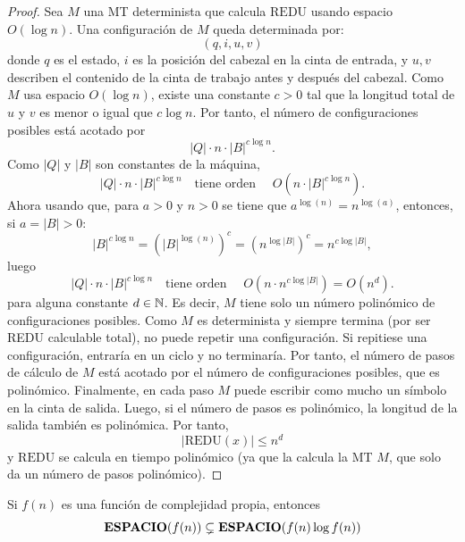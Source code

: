 \begin{ejercicio}
    \begin{proof}
        Sea $M$ una MT determinista que calcula $\mathrm{REDU}$ usando espacio
        $O(\log n)$. Una configuración de $M$ queda 
        determinada por: $$(q,i,u,v)$$
        donde $q$ es el estado, $i$ es la posición del cabezal en la cinta de
        entrada, y $u,v$ describen el contenido de la cinta de trabajo antes y
        después del cabezal. Como $M$ usa espacio $O(\log n)$, existe una constante
        $c > 0$ tal que la longitud total de $u$ y $v$ es menor o igual que
        $c\log n$. Por tanto, el número de configuraciones posibles está acotado por
        $$|Q|\cdot n\cdot |B|^{c\log n}.$$
        Como $|Q|$ y $|B|$ son constantes de la máquina,
        $$|Q|\cdot n\cdot |B|^{c\log n} \quad \text{tiene orden } \quad O\left(n\cdot |B|^{c\log n}\right).
        $$Ahora usando que, para $a > 0$ y $n>0$ se tiene que $a^{\log(n)} = n^{\log(a)}$, entonces, si $a = |B| > 0$:
        $$|B|^{c\log n} = (|B|^{\log(n)})^{c} = (n^{\log |B|})^c = n^{c\log |B|},$$
        luego
        $$|Q|\cdot n\cdot |B|^{c\log n} \quad \text{tiene orden } \quad O(n \cdot n^{c \log |B|}) = O(n^d).
        $$
        para alguna constante $d \in \mathbb{N}$. Es decir, $M$ tiene solo un número polinómico
        de configuraciones posibles. Como $M$ es determinista y siempre termina (por ser REDU calculable total), no puede repetir una
        configuración. Si repitiese una configuración, entraría en un ciclo y no
        terminaría. Por tanto, el número de pasos de cálculo de $M$ está acotado por
        el número de configuraciones posibles, que es polinómico. Finalmente, en cada 
        paso $M$ puede escribir como mucho un símbolo en la cinta
        de salida. Luego, si el número de pasos es polinómico, la longitud de la salida
        también es polinómica. Por tanto,
        $$|\mathrm{REDU}(x)|\leq n^d$$
        y $\mathrm{REDU}$ se calcula en tiempo polinómico (ya que la calcula la MT $M$, que solo da un número
        de pasos polinómico).
    \end{proof}

    \begin{teo}\label{teo:jerarqesp}
        Si $f(n)$ es una función de complejidad propia, entonces 
        $$\textbf{ESPACIO}(f(n)) \subsetneq \textbf{ESPACIO}(f(n) \log f(n))$$ 
    \end{teo}


\end{ejercicio}
